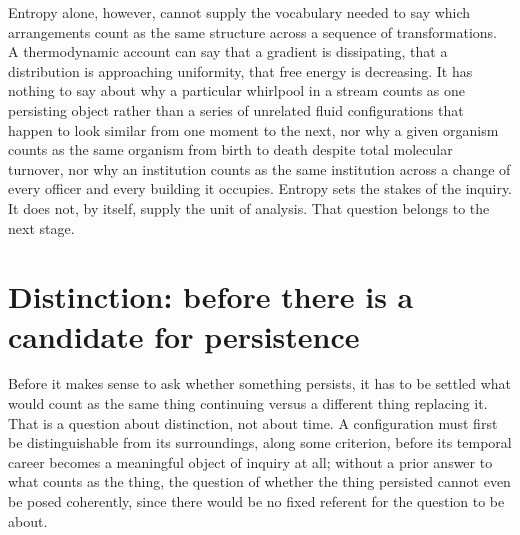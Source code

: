 \documentclass[11pt]{article}
\begin{document}
Entropy alone, however, cannot supply the vocabulary needed to say which arrangements count as the same structure across a sequence of transformations. A thermodynamic account can say that a gradient is dissipating, that a distribution is approaching uniformity, that free energy is decreasing. It has nothing to say about why a particular whirlpool in a stream counts as one persisting object rather than a series of unrelated fluid configurations that happen to look similar from one moment to the next, nor why a given organism counts as the same organism from birth to death despite total molecular turnover, nor why an institution counts as the same institution across a change of every officer and every building it occupies. Entropy sets the stakes of the inquiry. It does not, by itself, supply the unit of analysis. That question belongs to the next stage.

\section{Distinction: before there is a candidate for persistence}

Before it makes sense to ask whether something persists, it has to be settled what would count as the same thing continuing versus a different thing replacing it. That is a question about distinction, not about time. A configuration must first be distinguishable from its surroundings, along some criterion, before its temporal career becomes a meaningful object of inquiry at all; without a prior answer to what counts as the thing, the question of whether the thing persisted cannot even be posed coherently, since there would be no fixed referent for the question to be about.
\end{document}
